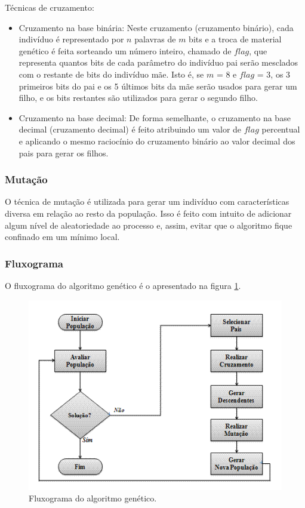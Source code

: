 \documentclass[a4paper,12pt]{article}
\begin{document}
Técnicas de cruzamento:

\begin{itemize}

\item Cruzamento na base binária: Neste cruzamento (cruzamento binário), cada indivíduo é representado por $n$ palavras de $m$ bits e a troca de material genético é feita sorteando um número inteiro, chamado de $flag$, que representa quantos bits de cada parâmetro do indivíduo pai serão mesclados com o restante de bits do indivíduo mãe. Isto é, se $m$ = 8 e $flag$ = 3, os 3 primeiros bits do pai e os 5 últimos bits da mãe serão usados para gerar um filho, e os bits restantes são utilizados para gerar o segundo filho.

\item Cruzamento na base decimal: De forma semelhante, o cruzamento na base decimal (cruzamento decimal) é feito atribuindo um valor de $flag$ percentual e aplicando o mesmo raciocínio do cruzamento binário ao valor decimal dos pais para gerar os filhos.
\end{itemize}

\subsubsection{Mutação}

O técnica de mutação é utilizada para gerar um indivíduo com características diversa em relação ao resto da população. Isso é feito com intuito de adicionar algum nível de aleatoriedade ao processo e, assim, evitar que o algoritmo fique confinado em um mínimo local.


\subsubsection{Fluxograma}

O fluxograma do algoritmo genético é o apresentado na figura \ref{fig:fluxo-ga}.
\begin{figure}[htb]
\begin{center}
    \includegraphics[scale=0.5]{fluxo-ga.png}
    \caption { Fluxograma do algoritmo genético. }
	\label{fig:fluxo-ga}
\end{center}
\end{figure}
\newpage
\end{document}
